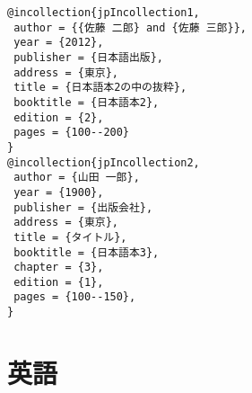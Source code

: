 \documentclass[9pt, twocolumn, a4paper]{jsarticle}
\begin{document}
\begin{bibunit}[jIEEEtran]
\begin{lstlisting}
@incollection{jpIncollection1,
 author = {{佐藤 二郎} and {佐藤 三郎}},
 year = {2012},
 publisher = {日本語出版},
 address = {東京},
 title = {日本語本2の中の抜粋},
 booktitle = {日本語本2},
 edition = {2},
 pages = {100--200}
}
@incollection{jpIncollection2,
 author = {山田 一郎},
 year = {1900},
 publisher = {出版会社},
 address = {東京},
 title = {タイトル},
 booktitle = {日本語本3},
 chapter = {3},
 edition = {1},
 pages = {100--150},
}
\end{lstlisting}

{\footnotesize \putbib[samplebib]}
\end{bibunit}

\clearpage
\section{英語}
\end{document}
